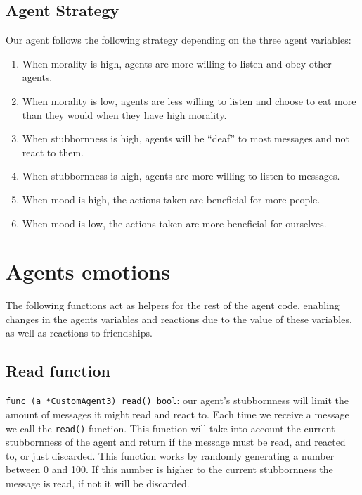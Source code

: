 \subsection{Agent Strategy}
Our agent follows the following strategy depending on the three agent variables:
\begin{enumerate}
    \item When morality is high, agents are more willing to listen and obey other agents.
    \item When morality is low, agents are less willing to listen and choose to eat more than they would when they have high morality.
    \item When stubbornness is high, agents will be “deaf” to most messages and not react to them.
    \item When stubbornness is high, agents are more willing to listen to messages.
    \item When mood is high, the actions taken are beneficial for more people.
    \item When mood is low, the actions taken are more beneficial for ourselves.
\end{enumerate}

\section{Agents emotions}\label{agents_emotions}
The following functions act as helpers for the rest of the agent code, enabling changes in the agents variables and reactions due to the value of these variables, as well as reactions to friendships. 

\subsection{Read function}
\texttt{func (a *CustomAgent3) read() bool}: our agent's stubbornness will limit the amount of messages it might read and react to. Each time we receive a message we call the \texttt{read()} function. This function will take into account the current stubbornness of the agent and return if the message must be read, and reacted to, or just discarded. 
This function works by randomly generating a number between 0 and 100. If this number is higher to the current stubbornness the message is read, if not it will be discarded. 


